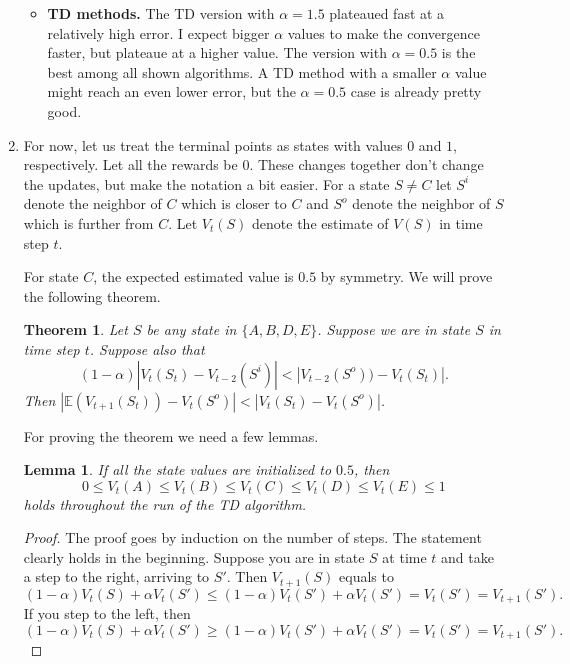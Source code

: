 \documentclass[12pt,a4paper]{article}
\newtheorem{lemma}{Lemma}
\newtheorem{thm}{Theorem}
\begin{document}
\begin{enumerate}
\begin{itemize}
\item \textbf{TD methods.}
The TD version with $\alpha = 1.5$ plateaued fast at a relatively high error. I expect
bigger $\alpha$ values to make the convergence faster, but plateaue at a higher value.
The version with $\alpha = 0.5$ is the best among all shown algorithms. A TD method with a smaller
$\alpha$ value might reach an even lower error, but the $\alpha = 0.5$ case is already pretty good.
\end{itemize}

\item
For now, let us treat the terminal points as states with values $0$ and $1$,
respectively. Let all the rewards be $0$. These changes together don't change
the updates, but make the notation a bit easier. For a state $S \neq C$ let
$S^i$ denote the neighbor of $C$ which is closer to $C$ and $S^o$ denote the
neighbor of $S$ which is further from $C$. Let $V_t(S)$ denote the estimate of
$V(S)$ in time step $t$.

For state $C$, the expected estimated value is $0.5$ by symmetry. We will prove
the following theorem.
\begin{thm}\label{thm}
  Let $S$ be any state in $\{A, B, D, E\}$. Suppose we are in state $S$ in
  time step $t$. Suppose also that
  \[(1 - \alpha) |V_t(S_t) - V_{t - 2} (S^i)| < |V_{t - 2}(S^o)) - V_t(S_t)|.\] Then
  $|\mathbb{E}(V_{t + 1}(S_t)) - V_{t}(S^o)| < |V_t(S_t) - V_{t}(S^o)|$.
\end{thm}

For proving the theorem we need a few lemmas.

\begin{lemma}
  If all the state values are initialized to $0.5$, then
  \[0 \le V_t(A) \le V_t(B) \le V_t(C) \le V_t(D) \le V_t(E) \le 1\] holds throughout the
  run of the TD algorithm.
\end{lemma}
\begin{proof}
  The proof goes by induction on the number of steps. The statement clearly holds
  in the beginning. Suppose you are in state $S$ at time $t$ and take a step
  to the right, arriving to $S'$. Then $V_{t + 1}(S)$ equals to
  \[(1 - \alpha) V_t(S) + \alpha V_t(S') \le (1 - \alpha) V_t(S') + \alpha V_t(S') = V_t(S') = V_{t + 1}(S').\]
  If you step to the left, then
  \[(1 - \alpha) V_t(S) + \alpha V_t(S') \ge (1 - \alpha) V_t(S') + \alpha V_t(S') = V_t(S') = V_{t + 1}(S').\]
\end{proof}


\end{enumerate}
\end{document}
